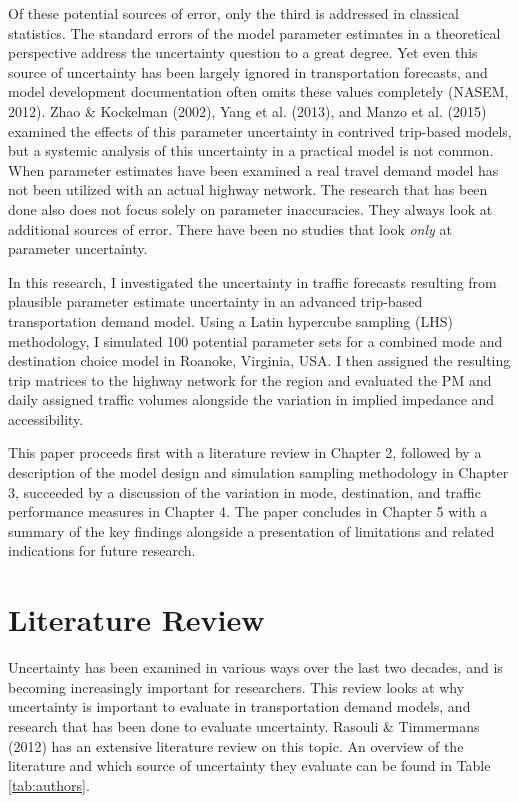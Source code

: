 \documentclass[fancy, masters]{byuthesis}
\begin{document}
Of these potential sources of error, only the third is addressed in classical statistics. The standard errors of the model parameter estimates in a theoretical perspective address the uncertainty question to a great degree. Yet even this source of uncertainty has been largely ignored in transportation forecasts, and model development documentation often omits these values completely (NASEM, 2012). Zhao \& Kockelman (2002), Yang et al. (2013), and Manzo et al. (2015) examined the effects of this parameter uncertainty in contrived trip-based models, but a systemic analysis of this uncertainty in a practical model is not common. When parameter estimates have been examined a real travel demand model has not been utilized with an actual highway network. The research that has been done also does not focus solely on parameter inaccuracies. They always look at additional sources of error. There have been no studies that look \emph{only} at parameter uncertainty.

In this research, I investigated the uncertainty in traffic forecasts resulting from plausible parameter estimate uncertainty in an advanced trip-based transportation demand model. Using a Latin hypercube sampling (LHS) methodology, I simulated 100 potential parameter sets for a combined mode and destination choice model in Roanoke, Virginia, USA. I then assigned the resulting trip matrices to the highway network for the region and evaluated the PM and daily assigned traffic volumes alongside the variation in implied impedance and accessibility.

This paper proceeds first with a literature review in Chapter 2, followed by a description of the model design and simulation sampling methodology in Chapter 3, succeeded by a discussion of the variation in mode, destination, and traffic performance measures in Chapter 4. The paper concludes in Chapter 5 with a summary of the key findings alongside a presentation of limitations and related indications for future research.

\hypertarget{literature-review}{%
\chapter{Literature Review}\label{literature-review}}

Uncertainty has been examined in various ways over the last two decades, and is becoming increasingly important for researchers. This review looks at why uncertainty is important to evaluate in transportation demand models, and research that has been done to evaluate uncertainty. Rasouli \& Timmermans (2012) has an extensive literature review on this topic. An overview of the literature and which source of uncertainty they evaluate can be found in Table \ref{tab:authors}.
\end{document}

